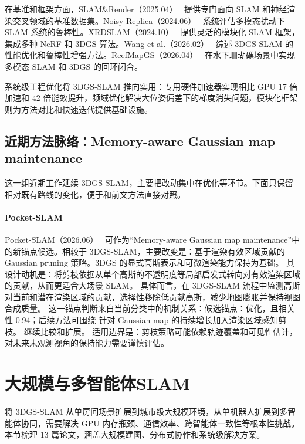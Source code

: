 在基准和框架方面，SLAM\&Render（2025.04）~\cite{2504_13713} 提供专门面向 SLAM 和神经渲染交叉领域的基准数据集。Noisy-Replica（2024.06）~\cite{2406_16850} 系统评估多模态扰动下 SLAM 系统的鲁棒性。XRDSLAM（2024.10）~\cite{2410_23690} 提供灵活的模块化 SLAM 框架，集成多种 NeRF 和 3DGS 算法。Wang et al.（2026.02）~\cite{2602_04251} 综述 3DGS-SLAM 的性能优化和鲁棒性增强方法。ReefMapGS（2026.04）~\cite{2604_11992} 在水下珊瑚礁场景中实现多模态 SLAM 和 3DGS 的回环闭合。

\begin{takeaway}
系统级工程优化将 3DGS-SLAM 推向实用：专用硬件加速器实现相比 GPU 17 倍加速和 42 倍能效提升，频域优化解决大位姿偏差下的梯度消失问题，模块化框架则为方法对比和快速迭代提供基础设施。
\end{takeaway}


\subsection{近期方法脉络：Memory-aware Gaussian map maintenance}

这一组近期工作延续 3DGS-SLAM，主要把改动集中在优化等环节。下面只保留相对既有路线的变化，便于和前文方法直接对照。

\paragraph{Pocket-SLAM}
Pocket-SLAM（2026.06）~\cite{2606_24796} 可作为“Memory-aware Gaussian map maintenance”中的新锚点候选。相较于 3DGS-SLAM，主要改变是：基于渲染有效区域贡献的 Gaussian pruning 策略。3DGS 的显式高斯表示和可微渲染能力保持为基础。
其设计动机是：将剪枝依据从单个高斯的不透明度等局部启发式转向对有效渲染区域的贡献，从而更适合大场景 SLAM。
具体而言，在 3DGS-SLAM 流程中监测高斯对当前和潜在渲染区域的贡献，选择性移除低贡献高斯，减少地图膨胀并保持视图合成质量。
这一锚点判断来自当前分类中的机制关系：候选锚点：优化，且相关性 0.94；后续方法可围绕 针对 Gaussian map 的持续增长加入渲染区域感知剪枝。 继续比较和扩展。
适用边界是：剪枝策略可能依赖轨迹覆盖和可见性估计，对未来未观测视角的保持能力需要谨慎评估。
\section{大规模与多智能体SLAM}
\label{sec:15_8}

将 3DGS-SLAM 从单房间场景扩展到城市级大规模环境，从单机器人扩展到多智能体协同，需要解决 GPU 内存瓶颈、通信效率、跨智能体一致性等根本性挑战。本节梳理 13 篇论文，涵盖大规模建图、分布式协作和系统级解决方案。

